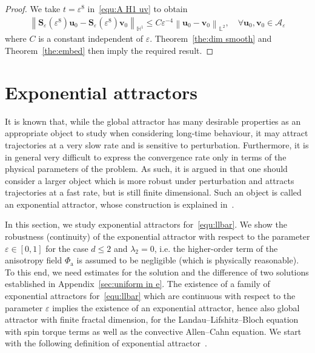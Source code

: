 \documentclass[11pt, reqno]{amsart}
\theoremstyle{definition}
\numberwithin{equation}{section}
\newcommand{\bff}{\boldsymbol}
\newcommand{\bb}{\mathbb}
\newcommand{\norm}[2]{\left\|{#1}\right\|_{#2}}
\begin{document}
\begin{proof}
We take $t=\varepsilon^8$ in~\eqref{equ:A H1 uv} to obtain
\begin{align*}
    \norm{\bff{S}_\varepsilon(\varepsilon^8) \bff{u}_0 - \bff{S}_\varepsilon(\varepsilon^8) \bff{v}_0}{\bb{H}^1} 
    \leq
    C \varepsilon^{-4} \norm{\bff{u}_0- \bff{v}_0}{\bb{L}^2},
    \quad \forall \bff{u}_0,\bff{v}_0\in \mathcal{A}_\varepsilon
\end{align*}
where $C$ is a constant independent of $\varepsilon$. Theorem~\ref{the:dim smooth} and Theorem~\ref{the:embed} then imply the required result.
\end{proof}


\section{Exponential attractors}\label{sec:furth attractor}

It is known that, while the global attractor has many desirable properties as an appropriate object to study when considering long-time behaviour, it may attract trajectories at a very slow rate and is sensitive to perturbation. Furthermore, it is in general very difficult to express the convergence rate only in terms of the physical parameters of the problem. As such, it is argued in \cite{EdeFoiNicTem94} that one should consider a larger object which is more robust under perturbation and attracts trajectories at a fast rate, but is still finite dimensional. Such an object is called an exponential attractor, whose construction is explained in~\cite{MirZel08}.

In this section, we study exponential attractors for~\eqref{equ:llbar}.
We show the robustness (continuity) of the exponential attractor with respect to the parameter $\varepsilon\in [0,1]$ for the case $d\leq 2$ and $\lambda_2=0$, i.e. the higher-order term of the anisotropy field $\Phi_{\mathrm{a}}$ is assumed to be negligible (which is physically reasonable). To this end, we need estimates for the solution and the difference of two solutions established in Appendix~\ref{sec:uniform in e}.
The existence of a family of exponential attractors for~\eqref{equ:llbar} which are continuous with respect to the parameter $\varepsilon$ implies the existence of an exponential attractor, hence also global attractor with finite fractal dimension, for the Landau--Lifshitz--Bloch equation with spin torque terms as well as the convective Allen--Cahn equation.
We start with the following definition of exponential attractor~\cite{MirZel08}.
\end{document}
